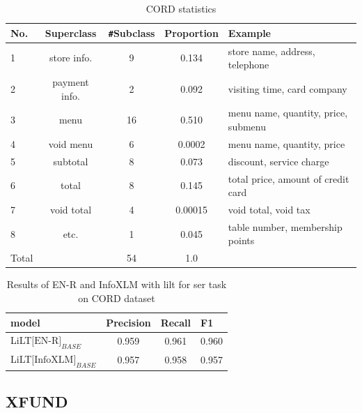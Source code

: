 \begin{table}[!ht]
    \centering
    \begin{tabular}{lcccl}
    \hline
         No.& Superclass & \verb|#|Subclass & Proportion & Example  \\ \toprule
         1 & store info. & 9 & 0.134 & store name, address, telephone \\
         2 & payment info. & 2 & 0.092 & visiting time, card company \\
         3 & menu & 16 & 0.510 & menu name, quantity, price, submenu \\
         4 & void menu & 6 & 0.0002 & menu name, quantity, price \\
         5 & subtotal & 8 & 0.073 & discount, service charge\\
         6 & total & 8 & 0.145 & total price, amount of credit card\\
         7 & void total & 4 & 0.00015 & void total, void tax\\
         8 & etc. & 1 & 0.045 & table number, membership points \\
         \hline
         Total & &54&1.0 & \\ \bottomrule
    \end{tabular}
    \caption{CORD\cite{park2019cord} statistics}
    \label{tab:CORD_statistics}
\end{table}


\begin{table}[!ht]
    \centering
    \captionsetup{justification=centering}
    \begin{tabular}{lccl}
    \hline
        \textbf{model} & \textbf{Precision} & \textbf{Recall} & \textbf{F1}  \\ \toprule
         
         LiLT\(\text{[EN-R]}_{BASE}\) &  0.959&  0.961& 0.960 \\
         LiLT\(\text{[InfoXLM]}_{BASE}\) & 0.957 & 0.958 & 0.957 \\ \bottomrule
    \end{tabular}
    \caption{Results of EN-R and InfoXLM with \acrshort{lilt} for \acrfull{ser} task on CORD \cite{park2019cord} dataset}
    \label{tab:cord_model_comparision}
\end{table}


\subsection{XFUND}


